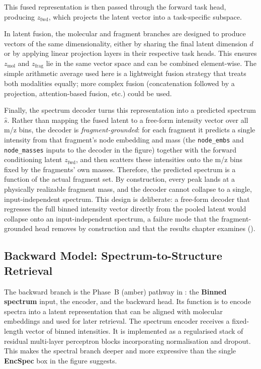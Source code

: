 This fused representation is then passed through the forward task head, producing $z_{\mathrm{fwd}}$, which projects the latent vector into a task-specific subspace.

In latent fusion, the molecular and fragment branches are designed to produce vectors of the same dimensionality, either by sharing the final latent dimension $d$ or by applying linear projection layers in their respective task heads.
This ensures $z_{\mathrm{mol}}$ and $z_{\mathrm{frag}}$ lie in the same vector space and can be combined element-wise.
The simple arithmetic average used here  is a lightweight fusion strategy that treats both modalities equally; more complex fusion (concatenation followed by a projection, attention-based fusion, etc.) could be used.

Finally, the spectrum decoder turns this representation into a predicted spectrum $\hat{s}$.
Rather than mapping the fused latent to a free-form intensity vector over all m/z bins, the decoder is \emph{fragment-grounded}: for each fragment it predicts a single intensity from that fragment's node embedding and mass (the \texttt{node\_embs} and \texttt{node\_masses} inputs to the decoder in the figure) together with the forward conditioning latent $z_{\mathrm{fwd}}$, and then scatters these intensities onto the m/z bins fixed by the fragments' own masses.
Therefore, the predicted spectrum is a function of the actual fragment set.
By construction, every peak lands at a physically realizable fragment mass, and the decoder cannot collapse to a single, input-independent spectrum.
This design is deliberate: a free-form decoder that regresses the full binned intensity vector directly from the pooled latent would collapse onto an input-independent spectrum, a failure mode that the fragment-grounded head removes by construction and that the results chapter examines ().

\subsection{Backward Model: Spectrum-to-Structure Retrieval}

The backward branch is the Phase~B (amber) pathway in : the \textbf{Binned spectrum} input, the encoder, and the backward head.
Its function is to encode spectra into a latent representation that can be aligned with molecular embeddings and used for later retrieval.
The spectrum encoder receives a fixed-length vector of binned intensities.
It is implemented as a regularised stack of residual multi-layer perceptron blocks incorporating normalisation and dropout.
This makes the spectral branch deeper and more expressive than the single \textbf{EncSpec} box in the figure suggests.

